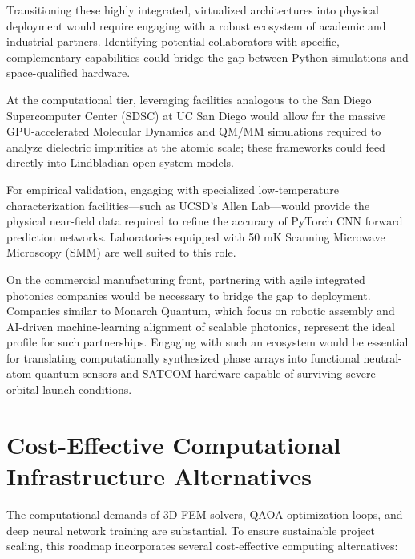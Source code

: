 \documentclass[11pt, a4paper]{article}
\begin{document}
Transitioning these highly integrated, virtualized architectures into physical deployment would require engaging with a robust ecosystem of academic and industrial partners. Identifying potential collaborators with specific, complementary capabilities could bridge the gap between Python simulations and space-qualified hardware.

At the computational tier, leveraging facilities analogous to the San Diego Supercomputer Center (SDSC) at UC San Diego would allow for the massive GPU-accelerated Molecular Dynamics and QM/MM simulations required to analyze dielectric impurities at the atomic scale; these frameworks could feed directly into Lindbladian open-system models.

For empirical validation, engaging with specialized low-temperature characterization facilities---such as UCSD's Allen Lab---would provide the physical near-field data required to refine the accuracy of PyTorch CNN forward prediction networks. Laboratories equipped with 50 mK Scanning Microwave Microscopy (SMM) are well suited to this role.

On the commercial manufacturing front, partnering with agile integrated photonics companies would be necessary to bridge the gap to deployment. Companies similar to Monarch Quantum, which focus on robotic assembly and AI-driven machine-learning alignment of scalable photonics, represent the ideal profile for such partnerships. Engaging with such an ecosystem would be essential for translating computationally synthesized phase arrays into functional neutral-atom quantum sensors and SATCOM hardware capable of surviving severe orbital launch conditions.

\section{Cost-Effective Computational Infrastructure Alternatives}

The computational demands of 3D FEM solvers, QAOA optimization loops, and deep neural network training are substantial. To ensure sustainable project scaling, this roadmap incorporates several cost-effective computing alternatives:
\end{document}
